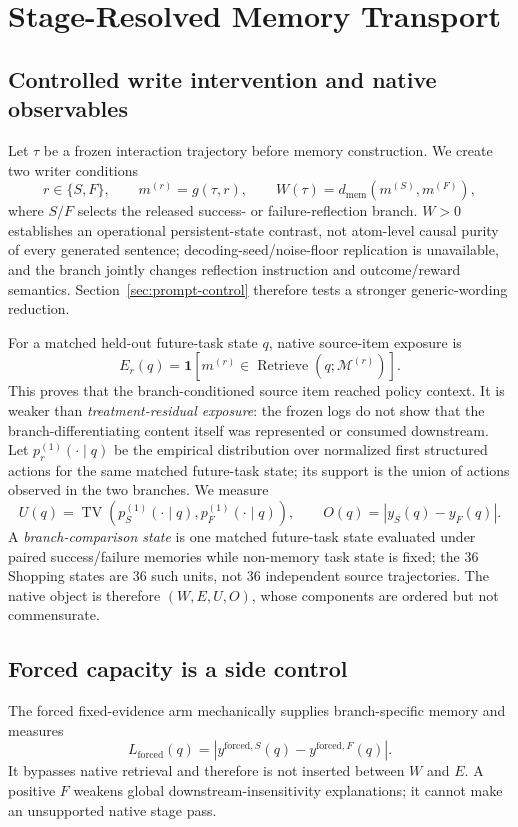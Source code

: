 \section{Stage-Resolved Memory Transport}
\label{sec:mechanism}

\subsection{Controlled write intervention and native observables}
Let $\tau$ be a frozen interaction trajectory before memory construction. We create two writer conditions
\[
 r\in\{S,F\},\qquad m^{(r)}=g(\tau,r),\qquad W(\tau)=d_{\mathrm{mem}}(m^{(S)},m^{(F)}),
\]
where $S/F$ selects the released success- or failure-reflection branch. $W>0$ establishes an operational persistent-state contrast, not atom-level causal purity of every generated sentence; decoding-seed/noise-floor replication is unavailable, and the branch jointly changes reflection instruction and outcome/reward semantics. Section~\ref{sec:prompt-control} therefore tests a stronger generic-wording reduction.

For a matched held-out future-task state $q$, native source-item exposure is
\[
 E_r(q)=\mathbf{1}[m^{(r)}\in\operatorname{Retrieve}(q;\mathcal{M}^{(r)})].
\]
This proves that the branch-conditioned source item reached policy context. It is weaker than \emph{treatment-residual exposure}: the frozen logs do not show that the branch-differentiating content itself was represented or consumed downstream. Let $p_r^{(1)}(\cdot\mid q)$ be the empirical distribution over normalized first structured actions for the same matched future-task state; its support is the union of actions observed in the two branches. We measure
\[
 U(q)=\operatorname{TV}(p_S^{(1)}(\cdot\mid q),p_F^{(1)}(\cdot\mid q)),\qquad
 O(q)=|y_S(q)-y_F(q)|.
\]
A \emph{branch-comparison state} is one matched future-task state evaluated under paired success/failure memories while non-memory task state is fixed; the 36 Shopping states are 36 such units, not 36 independent source trajectories. The native object is therefore $(W,E,U,O)$, whose components are ordered but not commensurate.

\subsection{Forced capacity is a side control}
The forced fixed-evidence arm mechanically supplies branch-specific memory and measures
\[
 L_{\mathrm{forced}}(q)=|y^{\mathrm{forced},S}(q)-y^{\mathrm{forced},F}(q)|.
\]
It bypasses native retrieval and therefore is not inserted between $W$ and $E$. A positive $F$ weakens global downstream-insensitivity explanations; it cannot make an unsupported native stage pass.

